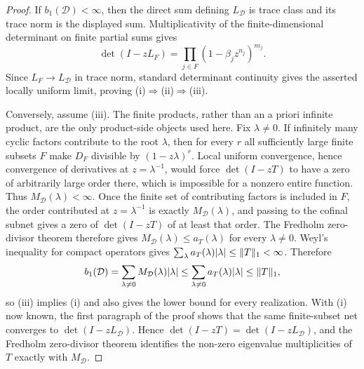 \begin{proof}
  If \(b_1(\mathcal D)<\infty\), then the direct sum defining
  \(L_{\mathcal D}\) is trace class and its trace norm is the displayed sum.
  Multiplicativity of the finite-dimensional determinant on finite partial
  sums gives
  \[
    \det(I-zL_F)=\prod_{j\in F}(1-\beta_jz^{n_j})^{m_j}.
  \]
  Since \(L_F\to L_{\mathcal D}\) in trace norm, standard determinant
  continuity gives the asserted locally uniform limit, proving
  \textup{(i)}\(\Rightarrow\)\textup{(ii)}\(\Rightarrow\)\textup{(iii)}.

  Conversely, assume \textup{(iii)}.  The finite products, rather than an
  a priori infinite product, are the only product-side objects used here.  Fix
  \(\lambda\ne0\).  If infinitely many cyclic factors contribute to the root
  \(\lambda\), then for every \(r\) all sufficiently large finite subsets
  \(F\) make \(D_F\) divisible by \((1-z\lambda)^r\).  Local uniform
  convergence, hence convergence of derivatives at \(z=\lambda^{-1}\), would
  force \(\det(I-zT)\) to have a zero of arbitrarily large order there, which is
  impossible for a nonzero entire function.  Thus \(M_{\mathcal D}(\lambda)<
  \infty\).  Once the finite set of contributing factors is included in \(F\),
  the order contributed at \(z=\lambda^{-1}\) is exactly
  \(M_{\mathcal D}(\lambda)\), and passing to the cofinal subnet gives a zero
  of \(\det(I-zT)\) of at least that order.  The Fredholm zero-divisor theorem
  therefore gives
  \(M_{\mathcal D}(\lambda)\le a_T(\lambda)\) for every \(\lambda\ne0\).
  Weyl's inequality for compact operators gives
  \(\sum_{\lambda}a_T(\lambda)\lvert \lambda \rvert\le\|T\|_1<\infty\).  Therefore
  \[
    b_1(\mathcal D)=\sum_{\lambda\ne0}M_{\mathcal D}(\lambda)\lvert \lambda \rvert
    \le \sum_{\lambda\ne0}a_T(\lambda)\lvert \lambda \rvert
    \le \lVert T \rVert_1,
  \]
  so \textup{(iii)} implies \textup{(i)} and also gives the lower bound for
  every realization.  With \textup{(i)} now known, the first paragraph of the
  proof shows that the same finite-subset net converges to
  \(\det(I-zL_{\mathcal D})\).  Hence
  \(\det(I-zT)=\det(I-zL_{\mathcal D})\), and the Fredholm zero-divisor theorem
  identifies the non-zero eigenvalue multiplicities of \(T\) exactly with
  \(M_{\mathcal D}\).


\end{proof}
